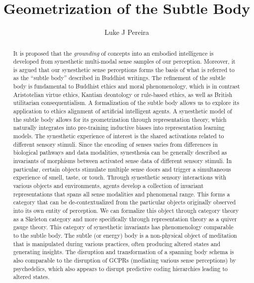\documentclass{article}
\title{\vspace{-3cm} Geometrization of the Subtle Body}
\author{Luke J Pereira}
\date{}
\theoremstyle{definition}
\begin{document}
\maketitle
\begin{abstract}
\noindent
It is proposed that the \textit{grounding} of concepts into an embodied intelligence is developed from synesthetic multi-modal sense samples of our perception.
Moreover, it is argued that our synesthetic sense perceptions forms the basis of what is referred to as the ``subtle body'' described in Buddhist writings.
The refinement of the subtle body is fundamental to Buddhist ethics and moral phenomenology, which is in contrast Aristotelian virtue ethics, Kantian deontology or rule-based ethics, as well as British utilitarian consequentialism. 
A formalization of the subtle body allows us to explore its application to ethics alignment of artificial intelligent agents.
A synesthetic model of the subtle body allows for its geometrization through representation theory, which naturally integrates into pre-training inductive biases into representation learning models.
The synesthetic experience of interest is the shared activations related to different sensory stimuli. 
Since the encoding of senses varies from differences in biological pathways and data modalities, synesthesia can be generally described as invariants of morphisms between activated sense data of different sensory stimuli.
In particular, certain objects stimulate multiple sense doors and trigger a simultaneous experience of smell, taste, or touch.
Through synesthetic sensory interactions with various objects and environments, agents develop a collection of invariant representations that spans all sense modalities and phenomenal range. 
This forms a category that can be de-contextualized from the particular objects originally observed into its own entity of perception.
We can formalize this object through category theory as a Skeleton category and more specifically through representation theory as a quiver gauge theory.
This category of synesthetic invariants has phenomenology comparable to the subtle body. 
The subtle (or energy) body is a non-physical object of meditation that is manipulated during various practices, often producing altered states and generating insights.
The disruption and transformation of a spanning body schema is also comparable to the disruption of GCPRs (mediating various sense perceptions) by psychedelics, which also appears to disrupt predictive coding hierarchies leading to altered states.
\end{abstract}

\newpage
\end{document}
